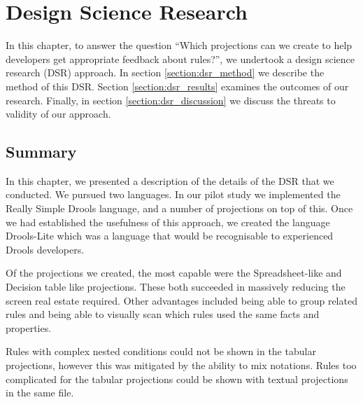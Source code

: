 \chapter{Design Science Research}
\label{chapter:DSR}

In this chapter, to answer the question ``Which projections can we create to help developers get appropriate feedback about rules?'', we undertook a design science research (DSR) approach.
In section \ref{section:dsr_method} we describe the method of this DSR.
Section \ref{section:dsr_results} examines the outcomes of our research.
Finally, in section \ref{section:dsr_discussion} we discuss the threats to validity of our approach.







\section{Summary}
In this chapter, we presented a description of the details of the DSR that we conducted.
We pursued two languages.
In our pilot study we implemented the Really Simple Drools language, and a number of projections on top of this.
Once we had established the usefulness of this approach, we created the language Drools-Lite which was a language that would be recognisable to experienced Drools developers.

Of the projections we created, the most capable were the Spreadsheet-like and Decision table like projections.
These both succeeded in massively reducing the screen real estate required.
Other advantages included being able to group related rules and being able to visually scan which rules used the same facts and properties.

Rules with complex nested conditions could not be shown in the tabular projections, however this was mitigated by the ability to mix notations.
Rules too complicated for the tabular projections could be shown with textual projections in the same file.